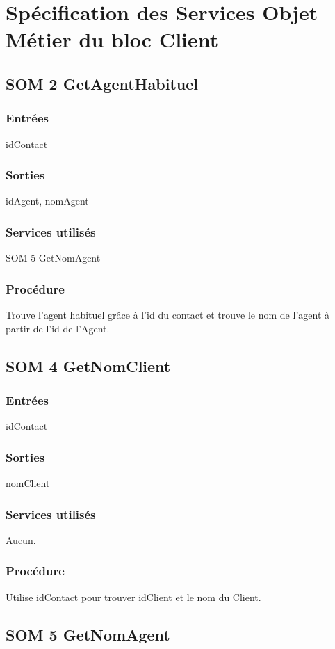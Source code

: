 \section{Spécification des Services Objet Métier du bloc Client}

\subsection{SOM 2 GetAgentHabituel}
\subsubsection{Entrées}
idContact
\subsubsection{Sorties}
idAgent, nomAgent
\subsubsection{Services utilisés}
SOM 5 GetNomAgent
\subsubsection{Procédure}
Trouve l'agent habituel grâce à l'id du contact et trouve le nom de l'agent à
partir de l'id de l'Agent.

\subsection{SOM 4 GetNomClient}
\subsubsection{Entrées}
idContact
\subsubsection{Sorties}
nomClient
\subsubsection{Services utilisés}
Aucun.
\subsubsection{Procédure}
Utilise idContact pour trouver idClient et le nom du Client.

\subsection{SOM 5 GetNomAgent}
